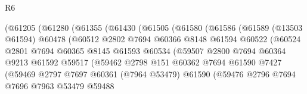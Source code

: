\begin{lexlean}{R6}
\begin{coremodule}
                        (@61205
                          (@61280
                            (@61355
                              (@61430
                                (@61505
                                  (@61580
                                    (@61586
                                      (@61589
                                        (@13503 @61594)
                                        @60478
                                        (@60512
                                          @2802
                                          @7694
                                          @60366
                                          @8148
                                          @61594
                                          @60522
                                          (@60524
                                            @2801
                                            @7694
                                            @60365
                                            @8145
                                            @61593
                                            @60534
                                            (@59507
                                              @2800
                                              @7694
                                              @60364
                                              @9213
                                              @61592
                                              @59517
                                              (@59462
                                                @2798
                                                @151
                                                @60362
                                                @7694
                                                @61590
                                                @7427
                                                (@59469
                                                  @2797
                                                  @7697
                                                  @60361
                                                  (@7964 @53479)
                                                  @61590
                                                  (@59476
                                                    @2796
                                                    @7694
                                                    @7696
                                                    @7963
                                                    @53479
                                                    @59488

\end{coremodule}
\end{lexlean}
